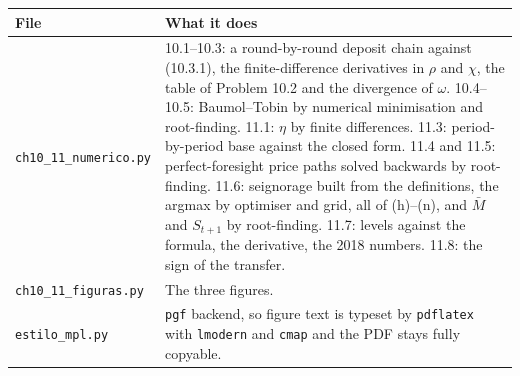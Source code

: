 \documentclass[12pt, letterpaper]{article}
\begin{document}
\begin{center}
\begin{tabular}{@{}lp{10.2cm}@{}}
\toprule
\textbf{File} & \textbf{What it does} \\
\midrule
\texttt{ch10\_11\_numerico.py} & 10.1--10.3: a round-by-round deposit chain against (10.3.1), the
finite-difference derivatives in $\rho$ and $\chi$, the table of Problem 10.2 and the divergence
of $\omega$. 10.4--10.5: Baumol--Tobin by numerical minimisation and root-finding. 11.1:
$\eta$ by finite differences. 11.3: period-by-period base against the closed form. 11.4 and
11.5: perfect-foresight price paths solved backwards by root-finding. 11.6: seignorage built from
the definitions, the argmax by optimiser and grid, all of (h)--(n), and $\bar M$ and $S_{t+1}$ by
root-finding. 11.7: levels against the formula, the derivative, the 2018 numbers. 11.8: the
sign of the transfer. \\
\texttt{ch10\_11\_figuras.py} & The three figures. \\
\texttt{estilo\_mpl.py} & \texttt{pgf} backend, so figure text is typeset by \texttt{pdflatex}
with \texttt{lmodern} and \texttt{cmap} and the PDF stays fully copyable. \\
\bottomrule
\end{tabular}
\end{center}
\end{document}
